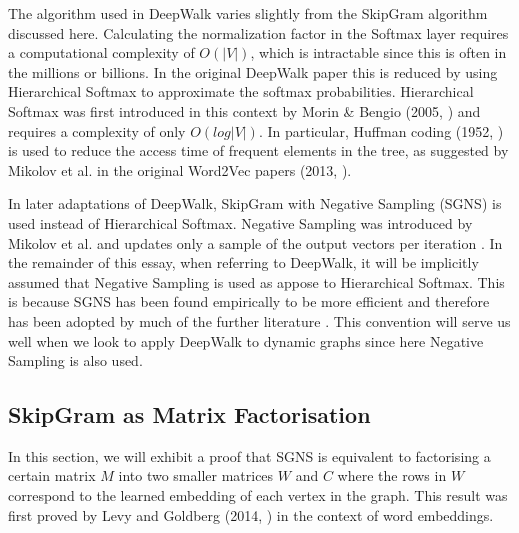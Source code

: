 \documentclass[a4paper]{article}
\begin{document}
The algorithm used in DeepWalk varies slightly from the SkipGram algorithm
discussed here. Calculating the normalization factor in the Softmax layer requires a
computational complexity of $O(|V|)$, which is intractable since this is often
in the millions or billions. In the original DeepWalk paper this is
reduced by using Hierarchical Softmax to approximate the softmax probabilities. Hierarchical Softmax was first introduced in this context by Morin \& Bengio (2005, \cite{morin2005}) and 
requires a complexity of only $O(log|V|)$. In particular, Huffman coding (1952, \cite{huffman1952}) is
used to reduce the access time of frequent elements in the tree, as suggested by
Mikolov et al. in the original Word2Vec
papers (2013, \cite{mikolov2013efficient,mikolov2013distributed}).

In later adaptations of DeepWalk, SkipGram with Negative Sampling (SGNS) is used instead of
Hierarchical Softmax. Negative Sampling was introduced by Mikolov et al. and updates only a sample of the output
vectors per iteration \cite{mikolov2013distributed}. In the remainder of this essay, when referring to DeepWalk, it will be
implicitly assumed that Negative Sampling is used as appose to Hierarchical
Softmax. This is because SGNS has been found empirically to be more efficient
and therefore has been adopted by much of the further literature \cite{mikolov2013distributed}. This convention will
serve us well when we look to apply DeepWalk to dynamic graphs since here Negative Sampling is also used.\\
\subsection{SkipGram as Matrix Factorisation}
In this section, we will exhibit a proof that SGNS is
equivalent to factorising a certain matrix $M$ into two smaller matrices $W$
and $C$ where the rows in $W$ correspond to the learned embedding of each vertex
in the graph. This result was first proved by Levy and
Goldberg (2014, \cite{levy&goldberg}) in the context of word embeddings.\\
\end{document}
